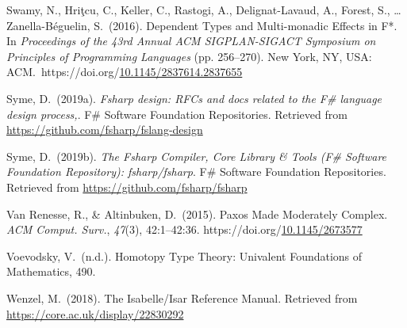 \documentclass[12pt,twoside]{article}
\begin{document}
{\begin{thebibliography}{222}
\mdbibitemlabel{}Swamy, N., Hriţcu, C., Keller, C., Rastogi, A., Delignat-Lavaud, A., Forest, S., … Zanella-Béguelin, S.~(2016). Dependent Types and Multi-monadic Effects in F*. In \emph{Proceedings of the 43rd Annual ACM SIGPLAN-SIGACT Symposium on Principles of Programming Languages} (pp. 256–270). New York, NY, USA: ACM.~https://doi.org/\href{https://dx.doi.org/10.1145/2837614.2837655}{10.1145/2837614.2837655}\label{swamy_dependent_2016}%

\mdbibitemlabel{}Syme, D.~(2019a). \emph{Fsharp design: RFCs and docs related to the F\# language design process,}. F\# Software Foundation Repositories. Retrieved from \href{https://github.com/fsharp/fslang-design}{{\ttfamily https://\hspace{0pt}github.\hspace{0pt}com/\hspace{0pt}fsharp/\hspace{0pt}fslang-\hspace{0pt}design}}\label{syme_fsharp_2019}%

\mdbibitemlabel{}Syme, D.~(2019b). \emph{The Fsharp Compiler, Core Library \& Tools (F\# Software Foundation Repository): fsharp/fsharp}. F\# Software Foundation Repositories. Retrieved from \href{https://github.com/fsharp/fsharp}{{\ttfamily https://\hspace{0pt}github.\hspace{0pt}com/\hspace{0pt}fsharp/\hspace{0pt}fsharp}}\label{syme_fsharp_2019-1}%

\mdbibitemlabel{}Van Renesse, R., \& Altinbuken, D.~(2015). Paxos Made Moderately Complex. \emph{ACM Comput. Surv.}, \emph{47}(3), 42:1–42:36. https://doi.org/\href{https://dx.doi.org/10.1145/2673577}{10.1145/2673577}\label{van_renesse_paxos_2015}%

\mdbibitemlabel{}Voevodsky, V.~(n.d.). Homotopy Type Theory: Univalent Foundations of Mathematics, 490.\label{voevodsky_homotopy_nodate}%

\mdbibitemlabel{}Wenzel, M.~(2018). The Isabelle/Isar Reference Manual. Retrieved from \href{https://core.ac.uk/display/22830292}{{\ttfamily https://\hspace{0pt}core.\hspace{0pt}ac.\hspace{0pt}uk/\hspace{0pt}display/\hspace{0pt}22830292}}\label{wenzel_isabelle/isar_2018}%


\end{thebibliography}}
\end{document}
